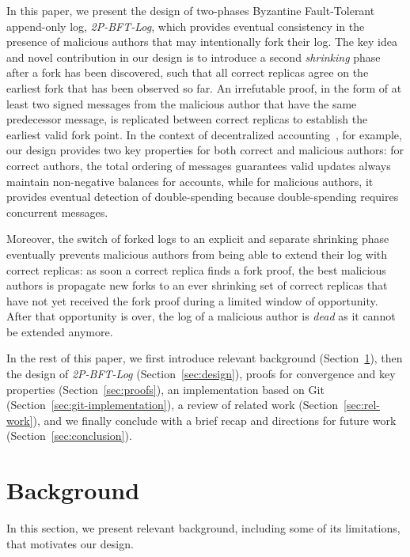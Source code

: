 \documentclass[9pt, oneside]{article}   	%
\begin{document}
In this paper, we present the design of two-phases Byzantine Fault-Tolerant append-only log, \textit{2P-BFT-Log}, which provides eventual consistency in the presence of malicious authors that may intentionally fork their log. The key idea and novel contribution in our design is to introduce a second \textit{shrinking} phase after a fork has been discovered, such that all correct replicas agree on the earliest fork that has been observed so far. An irrefutable proof, in the form of at least two signed messages from the malicious author that have the same predecessor message, is replicated between correct replicas to establish the earliest valid fork point. In the context of decentralized accounting~\cite{lavoie2023gocledger}, for example, our design provides two key properties for both correct and malicious authors: for correct authors, the total ordering of messages guarantees valid updates always maintain non-negative balances for accounts, while for malicious authors, it provides eventual detection of double-spending because double-spending requires concurrent messages.

Moreover, the switch of forked logs to an explicit and separate shrinking phase eventually prevents malicious authors from being able to extend their log with correct replicas: as soon a correct replica finds a fork proof, the best malicious authors is propagate new forks to an ever shrinking set of correct replicas that have not yet received the fork proof during a limited window of opportunity. After that opportunity is over, the log of a malicious author is \textit{dead} as it cannot be extended anymore.

In the rest of this paper, we first introduce relevant background (Section~\ref{sec:background}), then the design of \textit{2P-BFT-Log} (Section~\ref{sec:design}), proofs for convergence and key properties (Section~\ref{sec:proofs}), an implementation based on Git (Section~\ref{sec:git-implementation}), a review of related work (Section~\ref{sec:rel-work}), and we finally conclude with a brief recap and directions for future work (Section~\ref{sec:conclusion}).



\section{Background}
\label{sec:background}

In this section, we present relevant background, including some of its limitations, that motivates our design.
\end{document}
